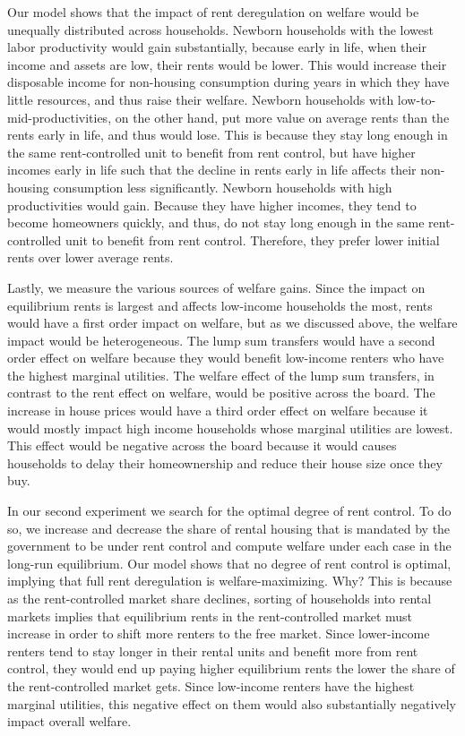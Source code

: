 \documentclass[parskip=full]{article}
\begin{document}
Our model shows that the impact of rent deregulation on welfare would be unequally distributed across households. Newborn households with the lowest labor productivity would gain substantially, because early in life, when their income and assets are low, their rents would be lower. This would increase their disposable income for non-housing consumption during years in which they have little resources, and thus raise their welfare. Newborn households with low-to-mid-productivities, on the other hand, put more value on average rents than the rents early in life, and thus would lose. This is because they stay long enough in the same rent-controlled unit to benefit from rent control, but have higher incomes early in life such that the decline in rents early in life affects their non-housing consumption less significantly. Newborn households with high productivities would gain. Because they have higher incomes, they tend to become homeowners quickly, and thus, do not stay long enough in the same rent-controlled unit to benefit from rent control. Therefore, they prefer lower initial rents over lower average rents. 

Lastly, we measure the various sources of welfare gains. Since the impact on equilibrium rents is largest and affects low-income households the most, rents would have a first order impact on welfare, but as we discussed above, the welfare impact would be heterogeneous. The lump sum transfers would have a second order effect on welfare because they would benefit low-income renters who have the highest marginal utilities. The welfare effect of the lump sum transfers, in contrast to the rent effect on welfare, would be positive across the board. The increase in house prices would have a third order effect on welfare because it would mostly impact high income households whose marginal utilities are lowest. This effect would be negative across the board because it would causes households to delay their homeownership and reduce their house size once they buy.

In our second experiment we search for the optimal degree of rent control. To do so, we increase and decrease the share of rental housing that is mandated by the government to be under rent control and compute welfare under each case in the long-run equilibrium. Our model shows that no degree of rent control is optimal, implying that full rent deregulation is welfare-maximizing. Why? This is because as the rent-controlled market share declines, sorting of households into rental markets implies that equilibrium rents in the rent-controlled market must increase in order to shift more renters to the free market. Since lower-income renters tend to stay longer in their rental units and benefit more from rent control, they would end up paying higher equilibrium rents the lower the share of the rent-controlled market gets. Since low-income renters have the highest marginal utilities, this negative effect on them would also substantially negatively impact overall welfare. 
\end{document}
